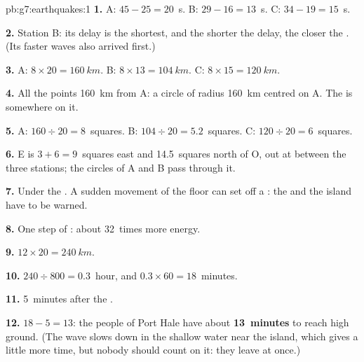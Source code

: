 \begin{solution}{pb:g7:earthquakes:1}
\textbf{1.} A: $45 - 25 = 20$~s. B: $29 - 16 = 13$~s. C: $34 - 19 =
15$~s.

\textbf{2.} Station B: its delay is the shortest, and the shorter the
delay, the closer the . (Its faster waves also arrived first.)

\textbf{3.} A: $8 \times 20 = \qty{160}{km}$. B: $8 \times 13 =
\qty{104}{km}$. C: $8 \times 15 = \qty{120}{km}$.

\textbf{4.} All the points \qty{160}{km} from A: a circle of radius
\qty{160}{km} centred on A. The  is somewhere on it.

\textbf{5.} A: $160 \div 20 = 8$~squares. B: $104 \div 20 = 5.2$~squares.
C: $120 \div 20 = 6$~squares.

\textbf{6.} E is $3 + 6 = 9$~squares east and 14.5~squares north of O, out
at  between the three stations; the circles of A and B pass through it.

\textbf{7.} Under the . A sudden movement of the  floor can set off a
: the  and the island have to be warned.

\textbf{8.} One step of : about 32~times more energy.

\textbf{9.} $12 \times 20 = \qty{240}{km}$.

\textbf{10.} $240 \div 800 = 0.3$~hour, and $0.3 \times 60 = 18$~minutes.

\textbf{11.} 5~minutes after the .

\textbf{12.} $18 - 5 = 13$: the people of Port Hale have about
\textbf{13~minutes} to reach high ground. (The wave slows down in the
shallow water near the island, which gives a little more time, but nobody
should count on it: they leave at once.)
\end{solution}
